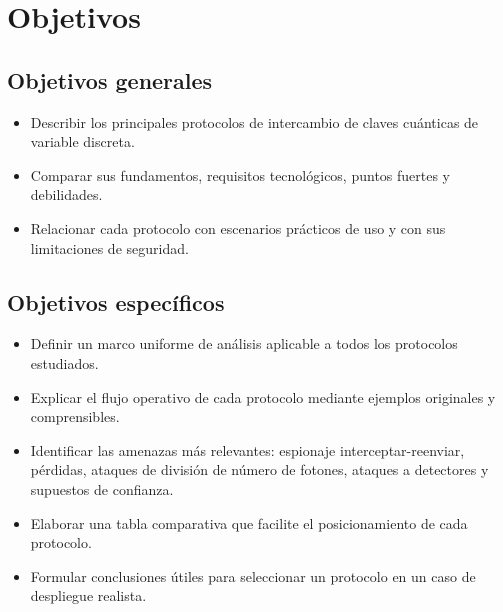 \chapter{Objetivos}

\section{Objetivos generales}
\begin{itemize}
    \item Describir los principales protocolos de intercambio de claves cuánticas de variable discreta.
    \item Comparar sus fundamentos, requisitos tecnológicos, puntos fuertes y debilidades.
    \item Relacionar cada protocolo con escenarios prácticos de uso y con sus limitaciones de seguridad.
\end{itemize}

\section{Objetivos específicos}
\begin{itemize}
    \item Definir un marco uniforme de análisis aplicable a todos los protocolos estudiados.
    \item Explicar el flujo operativo de cada protocolo mediante ejemplos originales y comprensibles.
    \item Identificar las amenazas más relevantes: espionaje interceptar-reenviar, pérdidas, ataques de división de número de fotones, ataques a detectores y supuestos de confianza.
    \item Elaborar una tabla comparativa que facilite el posicionamiento de cada protocolo.
    \item Formular conclusiones útiles para seleccionar un protocolo en un caso de despliegue realista.
\end{itemize}